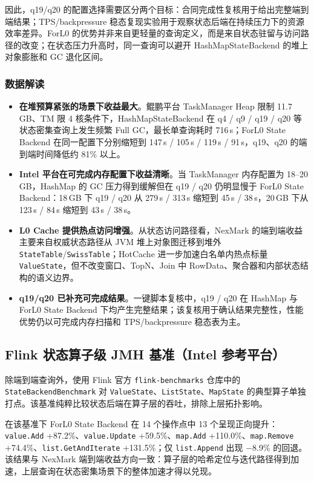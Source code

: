 \documentclass[a4paper,11pt]{article}
\newcommand{\project}{ForL0 State Backend}
\begin{document}
因此，q19/q20 的配置选择需要区分两个目标：合同完成性复核用于给出完整端到端结果；TPS/backpressure 稳态复现实验用于观察状态后端在持续压力下的资源效率差异。ForL0 的优势并非来自更轻量的查询定义，而是来自状态驻留与访问路径的改变；在状态压力升高时，同一查询可以避开 HashMapStateBackend 的堆上对象膨胀和 GC 退化区间。

\subsubsection{数据解读}

\begin{itemize}
  \item \textbf{在堆预算紧张的场景下收益最大}。鲲鹏平台 TaskManager Heap 限制 11.7\,GB、TM 限 4 核条件下，HashMapStateBackend 在 q4 / q9 / q19 / q20 等状态密集查询上发生频繁 Full GC，最长单查询耗时 716\,s；\project{} 在同一配置下分别缩短到 147\,s / 105\,s / 119\,s / 91\,s，q19、q20 的端到端时间降低约 81\% 以上。
  \item \textbf{Intel 平台在可完成内存配置下收益清晰}。当 TaskManager 内存配置为 18--20\,GB，HashMap 的 GC 压力得到缓解但在 q19 / q20 仍明显慢于 \project{}：18\,GB 下 q19 / q20 从 279\,s / 313\,s 缩短到 45\,s / 38\,s，20\,GB 下从 123\,s / 84\,s 缩短到 43\,s / 38\,s。
  \item \textbf{L0 Cache 提供热点访问增强}。从状态访问路径看，NexMark 的端到端收益主要来自权威状态路径从 JVM 堆上对象图迁移到堆外 \texttt{StateTable}/\texttt{SwissTable}；HotCache 进一步加速白名单内热点标量 \texttt{ValueState}，但不改变窗口、TopN、Join 中 RowData、聚合器和内部状态结构的语义边界。
  \item \textbf{q19/q20 已补充可完成结果}。一键脚本复核中，q19 / q20 在 HashMap 与 \project{} 下均产生完整结果；该复核用于确认结果完整性，性能优势仍以可完成内存扫描和 TPS/backpressure 稳态表为主。
\end{itemize}


\subsection{Flink 状态算子级 JMH 基准（Intel 参考平台）}

除端到端查询外，使用 Flink 官方 \texttt{flink-benchmarks} 仓库中的 \texttt{StateBackendBenchmark} 对 \texttt{ValueState}、\texttt{ListState}、\texttt{MapState} 的典型算子单独打点。该基准纯粹比较状态后端在算子层的吞吐，排除上层拓扑影响。


在该基准下 \project{} 在 14 个操作点中 13 个呈现正向提升：\texttt{value.Add} +87.2\%、\texttt{value.Update} +59.5\%、\texttt{map.Add} +110.0\%、\texttt{map.Remove} +74.4\%、\texttt{list.GetAndIterate} +131.5\%；仅 \texttt{list.Append} 出现 $-$8.9\% 的回退。该结果与 NexMark 端到端收益方向一致：算子层的哈希定位与迭代路径得到加速，上层查询在状态密集场景下的整体加速才得以兑现。
\end{document}
